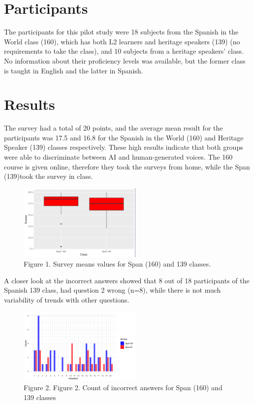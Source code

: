 \documentclass[
  a4paper,
  11pt,
  twocolumn]{article}
\begin{document}
\section{Participants}

The participants for this pilot study were 18 subjects from the Spanish
in the World class (160), which has both L2 learners and heritage
speakers (139) (no requirements to take the class), and 10 subjects from
a heritage speakers' class. No information about their proficiency
levels was available, but the former class is taught in English and the
latter in Spanish.

\section{Results}

The survey had a total of 20 points, and the average mean result for the
participants was 17.5 and 16.8 for the Spanish in the World (160) and
Heritage Speaker (139) classes respectively. These high results indicate
that both groups were able to discriminate between AI and
human-generated voices. The 160 course is given online, therefore they
took the surveys from home, while the Span (139)took the survey in
class.

\begin{figure}[!ht]
\begin{center}
\includegraphics[width=6cm]{./includes/figures/mean.png}
\caption{Figure 1. Survey means values for Span (160) and 139 classes.}\label{fig:vowels}
\end{center}
\end{figure}

A closer look at the incorrect answers showed that 8 out of 18
participants of the Spanish 139 class, had question 2 wrong (n=8), while
there is not much variability of trends with other questions.

\begin{figure}[!ht]
\begin{center}
\includegraphics[width=6cm]{./includes/figures/incorrect plot.png}
\caption{Figure 2. Figure 2. Count of incorrect answers for Span (160) and 139 classes}\label{fig:vowels}
\end{center}
\end{figure}
\end{document}
